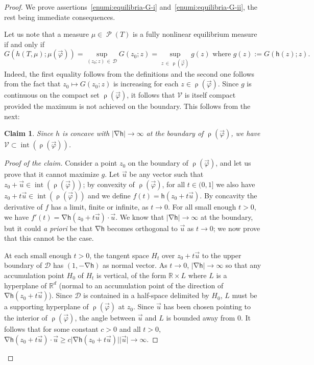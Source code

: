 \documentclass[AHL, Unicode, longabstracts,published]{cedram}
\theoremstyle{plain}
\theoremstyle{plain}
\newtheorem{claim}{Claim}
\newcommand\vpot{\vec\pot}
\newcommand\inter{\operatorname{int}}
\newcommand\Prob{{\operatorname{\mathscr{P}}}}
\newcommand{\rs}{\operatorname{\rho}}
\newcommand{\grad}{\operatorname{\nabla}}
\newcommand{\hf}{\mathsf{h}}
\newcommand{\pot}{\varphi}
\newcounter{In}
\newcommand*\8{\infty}
\newcommand\RR{\mathbb{R}}
\newcommand{\CD}{\mathcal{D}}
\newcommand{\cD}{\mathcal{D}}
\newcommand{\scV}{\mathscr{V}}
\begin{document}
\begin{proof}
We prove assertions~\eqref{enumi:equilibria-G-i} and~\eqref{enumi:equilibria-G-ii}, the rest being immediate consequences.

Let us note that a measure $\mu\in\Prob(T)$ is a fully nonlinear equilibrium measure if and only if
\[
G(h(T,\mu);\mu(\vpot)) = \sup_{(z_0; z)\,\in\,\CD} G(z_0; z) = \sup_{z\,\in\,\rs(\vpot)} g(z) \text{ where }g(z):=G(\hf(z); z).
\]
Indeed, the first equality follows from the definitions and the second one follows from the fact that $z_0\mapsto G(z_0; z)$ is increasing for each $ z\in\rs(\vpot)$. Since $g$ is continuous on the compact set $\rs(\vpot)$, it follows that $\scV$ is itself compact provided the maximum is not achieved on the boundary. This follows from the next:

\begin{claim}\label{claim-boundary}
Since $h$ is concave with $\lvert \grad\hf \rvert\to\infty$ at the boundary of $\rs(\vpot)$, we have $\scV\subset\inter(\rs(\vpot))$.
\end{claim}

\begin{proof}[Proof of the claim]
Consider a point $z_0$ on the boundary of $\rs(\vpot)$, and let us prove that it cannot maximize $g$. Let $\vec u$ be any vector such that $z_0+\vec u\in\inter(\rs(\vpot))$; by convexity of $\rs(\vpot)$, for all $t\in(0,1]$ we also have $z_0+t\vec u\in\inter(\rs(\vpot))$ and we define $f(t) = \hf(z_0+t\vec u)$. By concavity the derivative of $f$ has a limit, finite or infinite, as $t\to0$. For all {small enough} $t>0$, we have $f'(t) = \grad\hf(z_0+t\vec u) \cdot \vec u$. We know that $\lvert\grad \hf\rvert\to\infty$ at the boundary, but it could {\it a priori} be that $\grad \hf$ becomes orthogonal to $\vec u$ as $t\to0$; we now prove that this cannot be the case.

At each small enough $t>0$, the tangent space $H_t$ over $z_0+t\vec u$ to the upper boundary of $\cD$ has $(1,-\grad\hf)$ as normal vector. As $t\to0$, $\lvert \grad\hf\rvert\to\infty$ so that any accumulation point $H_0$ of $H_t$ is vertical, of the form $\RR\times L$ where $L$ is a hyperplane of $\RR^d$ (normal to an accumulation point of the direction of $\grad\hf(z_0+t\vec u)$). Since $\cD$ is contained in a half-space delimited by $H_0$, $L$ must be a supporting hyperplane of $\rs(\vpot)$ at $z_0$. Since $\vec u$ has been chosen pointing to the interior of $\rs(\vpot)$, the angle between $\vec u$ and $L$ is bounded away from $0$. It follows that for some constant $c>0$ and all $t>0$, $\grad\hf(z_0+t\vec u)\cdot\vec u \ge c\lvert \grad\hf(z_0+t\vec u)\rvert \lvert \vec u\rvert\to\infty$.


\end{proof}
\end{proof}
\end{document}

